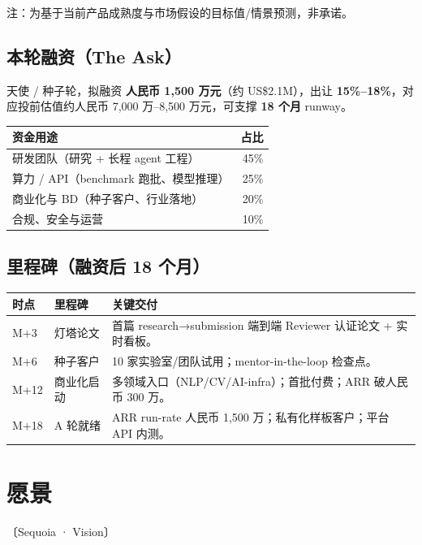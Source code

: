 \documentclass[UTF8,11pt,fontset=none]{ctexart}
\newcommand{\hl}[1]{\textbf{\color{argusnavy}#1}}
\newcommand{\thd}[1]{\textbf{\color{white}#1}}
\newcommand{\headrow}{\rowcolor{argusnavy}}
\newcommand{\altrow}{\rowcolor{arguslight}}
\newcommand{\sq}[1]{\hfill{\sffamily\footnotesize\color{argusgray}〔Sequoia · #1〕}}
\begin{document}
{\footnotesize\color{argusgray}注：为基于当前产品成熟度与市场假设的目标值/情景预测，非承诺。}\par

\subsection{本轮融资（The Ask）}

\begin{keybox}
天使 / 种子轮，拟融资 \hl{人民币 1,500 万元}（约 US\$2.1M），出让 \hl{15\%–18\%}，对应投前估值约人民币 7,000 万–8,500 万元，可支撑 \hl{18 个月} runway。
\end{keybox}

\begin{tabularx}{\textwidth}{@{}X r@{}}
\toprule
\headrow \thd{资金用途} & \thd{占比} \\
\midrule
\altrow 研发团队（研究 + 长程 agent 工程） & 45\% \\
算力 / API（benchmark 跑批、模型推理） & 25\% \\
\altrow 商业化与 BD（种子客户、行业落地） & 20\% \\
合规、安全与运营 & 10\% \\
\bottomrule
\end{tabularx}

\subsection{里程碑（融资后 18 个月）}
\begin{tabularx}{\textwidth}{@{}l >{\raggedright\arraybackslash}p{2.8cm} X@{}}
\toprule
\headrow \thd{时点} & \thd{里程碑} & \thd{关键交付} \\
\midrule
\altrow M+3 & 灯塔论文 & 首篇 research→submission 端到端 Reviewer 认证论文 + 实时看板。 \\
M+6 & 种子客户 & 10 家实验室/团队试用；mentor-in-the-loop 检查点。 \\
\altrow M+12 & 商业化启动 & 多领域入口（NLP/CV/AI-infra）；首批付费；ARR 破人民币 300 万。 \\
M+18 & A 轮就绪 & ARR run-rate 人民币 1,500 万；私有化样板客户；平台 API 内测。 \\
\bottomrule
\end{tabularx}

\section{愿景}\sq{Vision}
\end{document}
